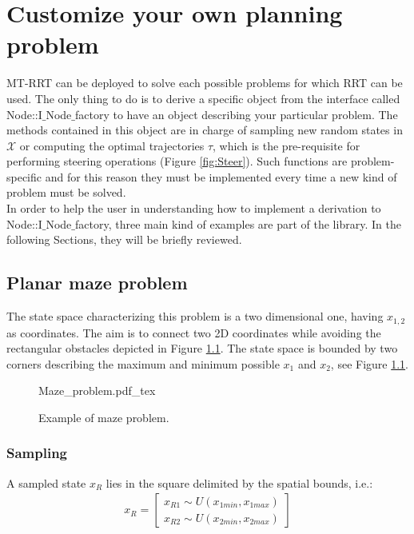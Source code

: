 \chapter{Customize your own planning problem}
\label{chap:custom}

MT-RRT can be deployed to solve each possible problems for which RRT can be used. The only thing to do is to derive a specific object from the interface called Node::I$\_$Node$\_$factory to have an object describing your particular problem. The methods contained in this object are in charge of sampling new random states in $\mathcal{X}$ or computing the optimal trajectories $\tau$, which is the pre-requisite for performing steering operations (Figure \ref{fig:Steer}).
Such functions are problem-specific and for this reason they must be implemented every time a new kind of problem must be solved.
\\
In order to help the user in understanding how to implement a derivation to Node::I$\_$Node$\_$factory, three main kind of examples are part of the library. In the following Sections, they will be briefly reviewed.

\section{Planar maze problem}

The state space characterizing this problem is a two dimensional one, having $x_{1,2}$ as coordinates. The aim is to connect two 2D coordinates while avoiding the rectangular obstacles depicted in Figure \ref{fig:Maze_problem}.
The state space is bounded by two corners describing the maximum and minimum possible $x_1$ and $x_2$, see Figure \ref{fig:Maze_problem}.

 \begin{figure}
	 \centering
 \def\svgwidth{0.85 \columnwidth}
 {Maze_problem.pdf_tex} 
	 \caption{Example of maze problem.}
 \label{fig:Maze_problem}
 \end{figure}

\subsection{Sampling}

A sampled state $x_R$ lies in the square delimited by the spatial bounds, i.e.:
\begin{eqnarray}
x_R = \begin{bmatrix} x_{R1} \sim U(x_{1min}, x_{1max}) \\ x_{R2} \sim U(x_{2min}, x_{2max})  \end{bmatrix}
\end{eqnarray}

